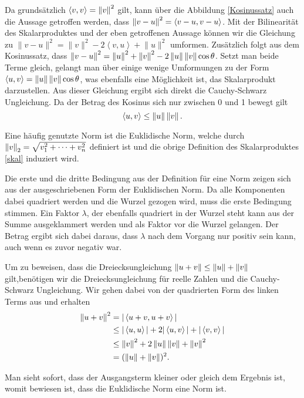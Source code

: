 Da grundsätzlich $\langle v,v\rangle  = \left\lVert v\right\rVert^2$ gilt, kann über die Abbildung \ref{Kosinussatz} auch die Aussage getroffen werden, dass $\left\lVert v-u\right\rVert^2 = \left\langle v-u,v-u\right\rangle $. Mit der Bilinearität des Skalarproduktes und der eben getroffenen Aussage können wir die Gleichung zu 
$\lVert v-u\rVert ^2 = \lVert v\rVert ^2 - 2\left\langle v,u\right\rangle  + \lVert u\rVert ^2$
umformen.
Zusätzlich folgt aus dem Kosinussatz, dass $\left\lVert v-u\right\rVert^2 = \left\lVert u\right\rVert^2 + \left\lVert v\right\rVert^2 - 2 \left\lVert u\right\rVert \left\lVert v\right\rVert \cos\theta$. Setzt man beide Terme gleich, gelangt man über einige wenige Umformungen zu der Form $\left\langle u,v\right\rangle  = \left\lVert u\right\rVert \left\lVert v\right\rVert \cos\theta$, was ebenfalls eine Möglichkeit ist, das Skalarprodukt darzustellen.
Aus dieser Gleichung ergibt sich direkt die Cauchy-Schwarz Ungleichung. Da der Betrag des Kosinus sich nur zwischen 0 und 1 bewegt gilt
\begin{equation}
\left\langle u,v\right\rangle  \leq \norm{u} \norm{v}.
\label{cauchy}
\end{equation}

Eine häufig genutzte Norm ist die Euklidische Norm, welche durch $\left\lVert v\right\rVert_2 = \sqrt{v_1^2 + \dots + v_n^2}$ definiert ist und die obrige Definition des Skalarproduktes \eqref{skal} induziert wird.

Die erste und die dritte Bedingung aus der Definition für eine Norm zeigen sich aus der ausgeschriebenen Form der Euklidischen Norm. Da alle Komponenten dabei quadriert werden und die Wurzel gezogen wird, muss die erste Bedingung stimmen. Ein Faktor $\lambda$, der ebenfalls quadriert in der Wurzel steht kann aus der Summe ausgeklammert werden und als Faktor vor die Wurzel gelangen. Der Betrag ergibt sich dabei daraus, dass $\lambda$ nach dem Vorgang nur positiv sein kann, auch wenn es zuvor negativ war.

Um zu beweisen, dass die Dreiecksungleichung $\left\lVert u+v\right\rVert \leq\left\lVert u\right\rVert + \left\lVert v\right\rVert$  gilt,benötigen wir die Dreiecksungleichung für reelle Zahlen und die Cauchy-Schwarz Ungleichung. Wir gehen dabei von der quadrierten Form des linken Terms aus und erhalten
\begin{align*}
\left\lVert u+v\right\rVert^2 &= |\left\langle u+v,u+v\right\rangle|\\
&\leq |\left\langle u,u\right\rangle| + 2|\left\langle u,v\right\rangle| + |\left\langle v,v\right\rangle|\\
&\leq \left\lVert v\right\rVert^2 + 2\left\lVert u\right\rVert \left\lVert v\right\rVert + \left\lVert v\right\rVert^2\\
&= (\left\lVert u\right\rVert + \left\lVert v\right\rVert)^2.
\end{align*}

Man sieht sofort, dass der Ausgangsterm kleiner oder gleich dem Ergebnis ist, womit bewiesen ist, dass die Euklidische Norm eine Norm ist.

%
